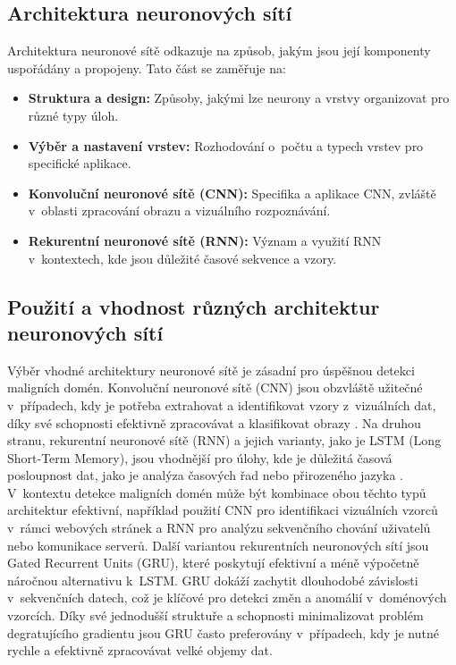 \subsection{Architektura neuronových sítí}
Architektura neuronové sítě odkazuje na způsob, jakým jsou její komponenty uspořádány a propojeny. Tato část se zaměřuje na:

\begin{itemize}
    \item \textbf{Struktura a design:} Způsoby, jakými lze neurony a vrstvy organizovat pro různé typy úloh.
    \item \textbf{Výběr a nastavení vrstev:} Rozhodování o~počtu a typech vrstev pro specifické aplikace.
    \item \textbf{Konvoluční neuronové sítě (CNN):} Specifika a aplikace CNN, zvláště v~oblasti zpracování obrazu a vizuálního rozpoznávání.
    \item \textbf{Rekurentní neuronové sítě (RNN):} Význam a využití RNN v~kontextech, kde jsou důležité časové sekvence a vzory.
\end{itemize}






\subsection{Použití a vhodnost různých architektur neuronových sítí}
Výběr vhodné architektury neuronové sítě je zásadní pro úspěšnou detekci maligních domén. Konvoluční neuronové sítě (CNN) jsou obzvláště užitečné v~případech, kdy je potřeba extrahovat a identifikovat vzory z~vizuálních dat, díky své schopnosti efektivně zpracovávat a klasifikovat obrazy \cite{ml_general}. Na druhou stranu, rekurentní neuronové sítě (RNN) a jejich varianty, jako je LSTM (Long Short-Term Memory), jsou vhodnější pro úlohy, kde je důležitá časová posloupnost dat, jako je analýza časových řad nebo přirozeného jazyka \cite{9095044}.  V~kontextu detekce maligních domén může být kombinace obou těchto typů architektur efektivní, například použití CNN pro identifikaci vizuálních vzorců v~rámci webových stránek a RNN pro analýzu sekvenčního chování uživatelů nebo komunikace serverů. Další variantou rekurentních neuronových sítí jsou Gated Recurrent Units (GRU), které poskytují efektivní a méně výpočetně náročnou alternativu k~LSTM. GRU dokáží zachytit  dlouhodobé závislosti v~sekvenčních datech, což je klíčové pro detekci změn a anomálií v~doménových vzorcích. Díky své jednodušší struktuře a schopnosti minimalizovat problém degratujícího gradientu jsou GRU často preferovány v~případech, kdy je nutné rychle a efektivně zpracovávat velké objemy dat\cite{cho2014gru}. 

